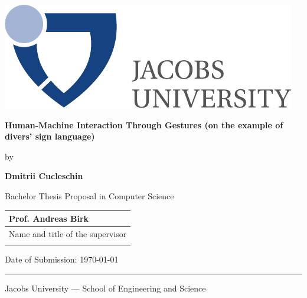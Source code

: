 \documentclass[a4paper,11pt,oneside]{article}
\newcommand{\myname}{Dmitrii Cucleschin}
\newcommand{\mytitle}{Human-Machine Interaction Through Gestures (on the example of divers' sign language)}
\newcommand{\mysupervisor}{Prof. Andreas Birk}
\begin{document}

  \thispagestyle{empty}

  \begin{flushright}
    \includegraphics[scale=0.7]{bsc-logo}
  \end{flushright}
  \vspace{20mm}
  \begin{center}
    \huge
    \textbf{\mytitle}
  \end{center}
  \vspace*{4mm}
  \begin{center}
   \Large by
  \end{center}
  \vspace*{4mm}
  \begin{center}
    \Large
    \textbf{\myname}
  \end{center}
  \vspace*{20mm}
  \begin{center}
    \large
    Bachelor Thesis Proposal in Computer Science
  \end{center}
  \vfill
  \begin{flushright}
    \large
    \begin{tabular}{l}
      \mysupervisor \\
      \hline
      Name and title of the supervisor \\
      \\
    \end{tabular}
  \end{flushright}
  \vspace*{8mm}
  \begin{flushleft}
    \large
    Date of Submission: \today \\
    \rule{\textwidth}{1pt}
  \end{flushleft}
  \begin{center}
    \Large Jacobs University --- School of Engineering and Science
  \end{center}

  \newpage
  \thispagestyle{empty}
\end{document}
